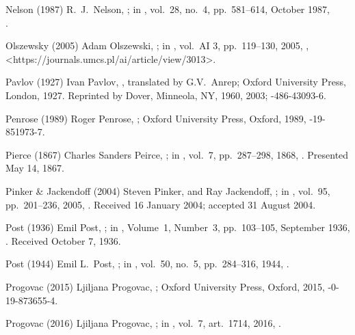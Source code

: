 \biblabel Nelson (1987)
R.\ J.\ Nelson,
;
in ,
vol.\ 28, no.\ 4, pp.\ 581--614, October 1987,\\
.

\biblabel Olszewsky (2005)
Adam Olszewski,
;
in ,
vol.\ AI 3, pp.\ 119--130, 2005,
,
\URL<https://journals.umcs.pl/ai/article/view/3013>.

\biblabel Pavlov (1927)
Ivan Pavlov,
,
translated by G.V.\ Anrep;
Oxford University Press, London, 1927.
Reprinted by Dover, Minneola, NY, 1960, 2003;
-486-43093-6.

\biblabel Penrose (1989)
Roger Penrose, \negthinspace
{};
Oxford University Press, Oxford, 1989,
-19-851973-7.

\biblabel Pierce (1867)
Charles Sanders Peirce,
;
in ,
vol.\ 7, pp.\ 287--298, 1868,
.
Presented May 14, 1867.

\biblabel Pinker \& Jackendoff (2004)
Steven Pinker, and Ray Jackendoff,
;
in ,
vol.\ 95, pp.\ 201--236, 2005,
.
Received 16 January 2004; accepted 31 August 2004.

\biblabel Post (1936)
Emil Post,
;
in ,
Volume\ 1, Number\ 3, pp.~103--105, September 1936,
.
Received October 7, 1936.

\biblabel Post (1944)
Emil L.\ Post,
;
in ,
vol.\ 50, no.~5, pp.\ 284--316, 1944,
.

\biblabel Progovac (2015)
Ljiljana Progovac,
;
Oxford University Press, Oxford, 2015,
-0-19-873655-4.

\biblabel Progovac (2016)
Ljiljana Progovac,
;
in ,
vol.\ 7, art.\ 1714, 2016,
.

